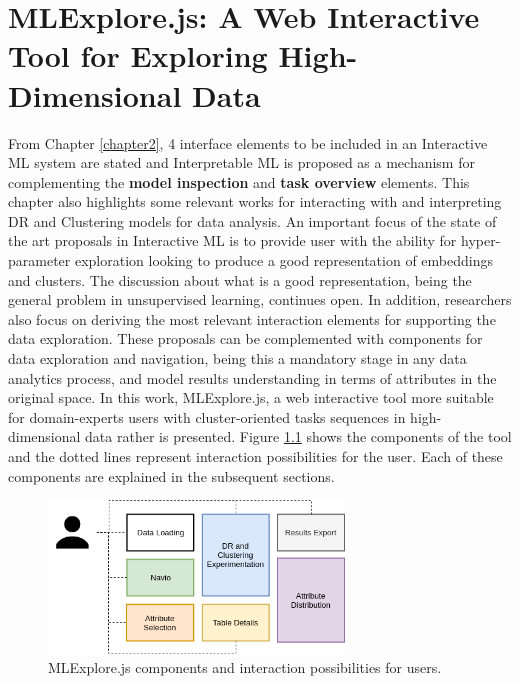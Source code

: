 
\chapter{MLExplore.js: A Web Interactive Tool for Exploring High-Dimensional Data}
\label{chapter3}

\graphicspath{{Chapter3/figs/}}

From Chapter \ref{chapter2}, 4 interface elements to be included in an Interactive ML system are stated and Interpretable ML is proposed as a mechanism for complementing the \textbf{model inspection} and \textbf{task overview} elements. This chapter also highlights some relevant works for interacting with and interpreting DR and Clustering models for data analysis. An important focus of the state of the art proposals in Interactive ML is to provide user with the ability for hyper-parameter exploration looking to produce a good representation of embeddings and clusters. The discussion about what is a good representation, being the general problem in unsupervised learning, continues open. In addition, researchers also focus on deriving the most relevant interaction elements for supporting the data exploration. These proposals can be complemented with components for data exploration and navigation, being this a mandatory stage in any data analytics process, and model results understanding in terms of attributes in the original space.  In this work, MLExplore.js, a web interactive tool more suitable for domain-experts users with cluster-oriented tasks sequences in high-dimensional data rather is presented. Figure \ref{fig:mlexplore-components} shows the components of the tool and the dotted lines represent interaction possibilities for the user. Each of these components are explained in the subsequent sections. 

\begin{figure}[ht]
 \centering
 \includegraphics[width=0.7\textwidth]{MLExplore-components.png}
 \caption{MLExplore.js components and interaction possibilities for users.}
 \label{fig:mlexplore-components}
\end{figure}

